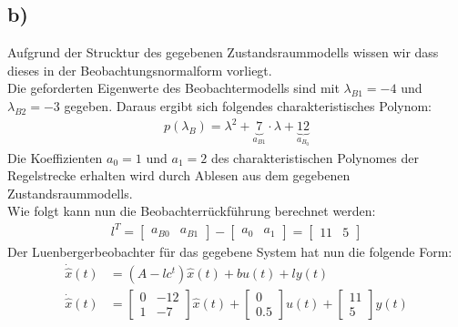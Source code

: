 \documentclass[11pt]{scrartcl} %
\begin{document}
\subsection*{b)}
Aufgrund der Strucktur des gegebenen Zustandsraummodells wissen wir dass dieses in der Beobachtungsnormalform vorliegt.\\
Die geforderten Eigenwerte des Beobachtermodells sind mit $\lambda_{B1}=-4$ und $\lambda_{B2}=-3$ gegeben. Daraus ergibt sich folgendes charakteristisches Polynom:
\begin{align*}
	p(\lambda_B)=\lambda^2+\underbrace{7}_{a_{B1}}\cdot\lambda+\underbrace{12}_{a_{B_0}}
\end{align*}
Die Koeffizienten $a_0=1$ und $a_1=2$ des charakteristischen Polynomes der Regelstrecke erhalten wird durch Ablesen aus dem gegebenen Zustandsraummodells.\\
Wie folgt kann nun die Beobachterrückführung berechnet werden:
\begin{align*}
	l^T=\begin{bmatrix}a_{B0}&a_{B1}\end{bmatrix}-\begin{bmatrix}a_{0}&a_{1}\end{bmatrix}=\begin{bmatrix}11&5\end{bmatrix}
\end{align*}
Der Luenbergerbeobachter für das gegebene System hat nun die folgende Form:
\begin{align*}
	\dot{\hat{x}}(t)&=(A-lc^t)\hat{x}(t)+bu(t)+ly(t)\\
	\dot{\hat{x}}(t)&=\begin{bmatrix}0&-12\\1&-7\end{bmatrix}\hat{x}(t)+\begin{bmatrix}0\\0.5\end{bmatrix}u(t)+\begin{bmatrix}11\\5\end{bmatrix}y(t)
\end{align*}
\end{document}
